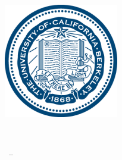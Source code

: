 
\begin{titlepage}

\begin{addmargin}[-1cm]{-3cm}
\begin{center}
\large

\hfill
\vfill

\begingroup
\color{title}\spacedallcaps{\myTitle} \\ \bigskip %
\endgroup

\spacedallcaps{\myName} %

\vfill

\includegraphics[width=5cm]{figures/ucberkeleyseal_line_540.eps} \\ \medskip %

\mySubtitle \\ \medskip %

\myTime\ -- \myVersion %

\vfill

\end{center}
\end{addmargin}

\end{titlepage}
